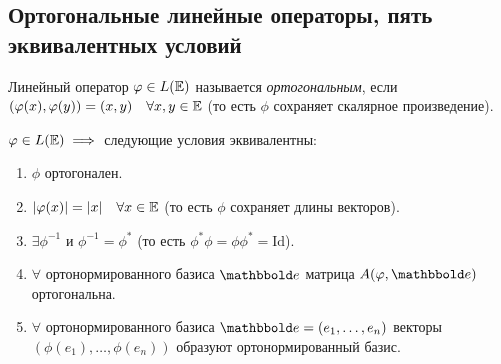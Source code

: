 \subsection{Ортогональные линейные операторы, пять эквивалентных условий}

\begin{definition}
    Линейный оператор $\varphi \in L(\mathbb{E})$ называется \textit{ортогональным}, если $(\varphi(x), \varphi(y)) = (x, y) \quad \forall x, y \in \mathbb{E}$ (то есть $\phi$ сохраняет скалярное произведение).
\end{definition}

\begin{theorem}
    $\varphi \in L(\mathbb{E}) \implies $ следующие условия эквивалентны:
    \begin{enumerate}[label=(\arabic*)]
    \item \label{lec30:eq1} $\phi$ ортогонален.
    \item \label{lec30:eq2} $\left|\varphi(x)\right| = |x| \quad \forall x \in \mathbb{E}$ (то есть $\phi$ сохраняет длины векторов).
    \item \label{lec30:eq3} $\exists \phi^{-1}$ и $\phi^{-1} = \phi^{*}$ (то есть $\phi^{*} \phi = \phi \phi^{*} = \mathrm{Id}$).
    \item \label{lec30:eq4} $\forall$ ортонормированного базиса $\E$ матрица $A(\phi, \E)$ ортогональна.
    \item \label{lec30:eq5} $\forall$ ортонормированного базиса $\E = (e_1, \dots, e_n)$ векторы $(\phi(e_1), \dots, \phi(e_n))$ образуют ортонормированный базис.
    \end{enumerate}
\end{theorem}

